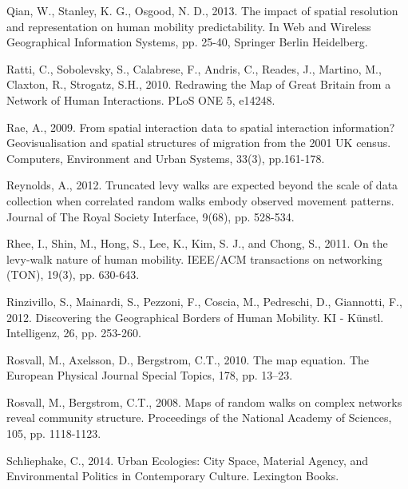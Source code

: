 \documentclass[]{tGIS2e}
\begin{document}
\begin{thebibliography}{9}
Qian, W., Stanley, K. G., Osgood, N. D., 2013. The impact of spatial resolution and representation on human mobility predictability. In Web and Wireless Geographical Information Systems,  pp. 25-40, Springer Berlin Heidelberg.

Ratti, C., Sobolevsky, S., Calabrese, F., Andris, C., Reades, J., Martino, M., Claxton, R., Strogatz, S.H., 2010. Redrawing the Map of Great Britain from a Network of Human Interactions. PLoS ONE 5, e14248.

Rae, A., 2009. From spatial interaction data to spatial interaction information? Geovisualisation and spatial structures of migration from the 2001 UK census. Computers, Environment and Urban Systems, 33(3), pp.161-178.

Reynolds, A., 2012. Truncated levy walks are expected beyond the scale of data collection when correlated random walks embody observed movement patterns. Journal of The Royal Society Interface, 9(68), pp. 528-534.

Rhee, I., Shin, M., Hong, S., Lee, K., Kim, S. J., and Chong, S., 2011. On the levy-walk nature of human mobility. IEEE/ACM transactions on networking (TON), 19(3), pp. 630-643.

Rinzivillo, S., Mainardi, S., Pezzoni, F., Coscia, M., Pedreschi, D., Giannotti, F., 2012. Discovering the Geographical Borders of Human Mobility. KI - Künstl. Intelligenz, 26, pp. 253-260.

Rosvall, M., Axelsson, D., Bergstrom, C.T., 2010. The map equation. The European Physical Journal Special Topics, 178, pp. 13–23.

Rosvall, M., Bergstrom, C.T., 2008. Maps of random walks on complex networks reveal community structure. Proceedings of the National Academy of Sciences, 105, pp. 1118-1123.

Schliephake, C., 2014. Urban Ecologies: City Space, Material Agency, and Environmental Politics in Contemporary Culture. Lexington Books.


\end{thebibliography}
\end{document}
